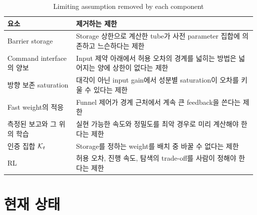 \documentclass[11pt]{article}\usepackage[margin=1in]{geometry}\usepackage{amsmath,amssymb,amsthm,mathtools}\usepackage{graphicx}\graphicspath{{figures/}{../figures/}{figs/}{./}}\usepackage{enumitem}\usepackage{hyperref}\usepackage{cleveref}\usepackage{tikz}\usetikzlibrary{arrows.meta,positioning,calc,shapes.geometric}\usepackage{float}\usepackage{rotating}\usepackage[most]{tcolorbox}\usepackage{kotex}\usepackage{booktabs}\emergencystretch=1.6em\tolerance=2000 \crefname{assumption}{Assumption}{Assumptions}\Crefname{assumption}{Assumption}{Assumptions}\crefname{definition}{Definition}{Definitions}\Crefname{definition}{Definition}{Definitions}\crefname{proposition}{Proposition}{Propositions}\Crefname{proposition}{Proposition}{Propositions}\crefname{fact}{Fact}{Facts}\Crefname{fact}{Fact}{Facts} \newtheorem{assumption}{Assumption}\newtheorem{definition}{Definition}\newtheorem{lemma}{Lemma}\newtheorem{proposition}{Proposition}\newtheorem{theorem}{Theorem}\newtheorem{corollary}{Corollary}\newtheorem{fact}{Fact}\theoremstyle{remark}\newtheorem{remark}{Remark} \newcommand{\R}{\mathbb{R}}\newcommand{\xb}{\bar x}\newcommand{\Ab}{\bar A}\newcommand{\By}{\bar B_y}\newcommand{\U}{\mathcal U}\newcommand{\Z}{\mathcal Z}
\begin{document}
\begin{table}[H]
\centering\footnotesize\setlength{\tabcolsep}{4pt}
\caption{Limiting assumption removed by each component}
\label{tab:synergy}
\begin{tabular}{p{4.0cm}p{10.4cm}}
\toprule
요소 & 제거하는 제한 \\
\midrule
Barrier storage & Storage 상한으로 계산한 tube가 사전 parameter 집합에 의존하고 느슨하다는 제한 \\
Command interface의 양보 & Input 제약 아래에서 허용 오차의 경계를 넓히는 방법은 넓어지는 양에 상한이 없다는 제한 \\
방향 보존 saturation & 대각이 아닌 input gain에서 성분별 saturation이 오차를 키울 수 있다는 제한 \\
Fast weight의 적응 & Funnel 제어가 경계 근처에서 계속 큰 feedback을 쓴다는 제한 \\
측정된 보고와 그 위의 학습 & 실현 가능한 속도와 정밀도를 최악 경우로 미리 계산해야 한다는 제한 \\
인증 집합 $\mathcal K_t$ & Storage를 정하는 weight를 배치 중 바꿀 수 없다는 제한 \\
RL & 허용 오차, 진행 속도, 탐색의 trade-off를 사람이 정해야 한다는 제한 \\
\bottomrule
\end{tabular}
\end{table}

\section{현재 상태}
\label{sec:status}
\end{document}

